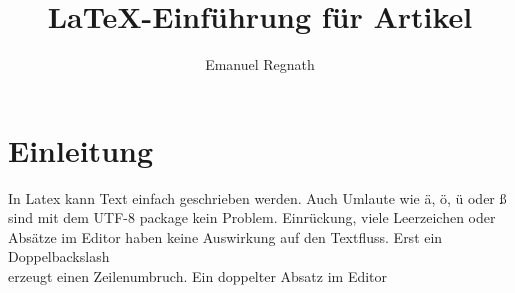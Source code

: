 \renewcommand{\arraystretch}{1.4}				%


\title{LaTeX-Einführung für Artikel}
\author{Emanuel Regnath}




 






\maketitle

\vspace{4.0cm}		%

\tableofcontents			


\newpage



\section{Einleitung}	%

In Latex kann Text einfach geschrieben werden. Auch Umlaute wie ä, ö, ü oder ß sind mit dem UTF-8 package kein Problem.
	Einrückung, viele           Leerzeichen oder Absätze im Editor 
haben keine Auswirkung auf den Textfluss.
Erst ein Doppelbackslash\\											%
erzeugt einen Zeilenumbruch. Ein doppelter Absatz im Editor			%

